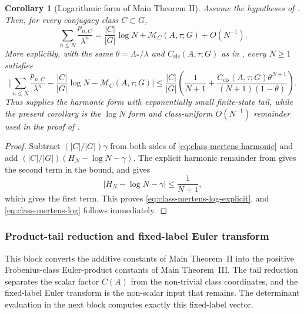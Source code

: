 \documentclass[11pt,a4paper]{amsart}
\theoremstyle{plain}
\newtheorem{corollary}[theorem]{Corollary}
\theoremstyle{definition}
\theoremstyle{remark}
\newcommand{\abs}[1]{\lvert #1 \rvert}
\begin{document}
\begin{corollary}[Logarithmic form of Main Theorem II]
  \label{cor:class-mertens-log-form}
  Assume the hypotheses of .  Then, for
  every conjugacy class \(C\subset G\),
  \begin{equation}\label{eq:class-mertens-log}
    \sum_{n\le N}\frac{p_{n,C}}{\lambda^n}
    =
    \frac{|C|}{|G|}\log N+\mathcal M_C(A,\tau;G)+O(N^{-1}).
  \end{equation}
  More explicitly, with the same \(\theta=\Lambda_*/\lambda\) and
  \(C_{\mathrm{cls}}(A,\tau;G)\) as in
  , every \(N\ge1\) satisfies
  \begin{equation}\label{eq:class-mertens-log-explicit}
    \abs{
      \sum_{n\le N}\frac{p_{n,C}}{\lambda^n}
      -\frac{|C|}{|G|}\log N
      -\mathcal M_C(A,\tau;G)
    }
    \le
    \frac{|C|}{|G|}
    \left(
      \frac{1}{N+1}
      +
      \frac{
        C_{\mathrm{cls}}(A,\tau;G)\theta^{N+1}
      }{
        (N+1)(1-\theta)
      }
    \right).
  \end{equation}
  Thus  supplies the harmonic form with
  exponentially small finite-state tail, while the present corollary is the
  \(\log N\) form and class-uniform \(O(N^{-1})\) remainder used in the
  proof of .
\end{corollary}

\begin{proof}
  Subtract \((|C|/|G|)\gamma\) from both sides of
  \eqref{eq:class-mertens-harmonic} and add
  \((|C|/|G|)(H_N-\log N-\gamma)\).  The explicit harmonic remainder from
   gives the second term in the bound, and
   gives
  \[
    \abs{H_N-\log N-\gamma}
    \le
    \frac{1}{N+1},
  \]
  which gives the first term.  This proves
  \eqref{eq:class-mertens-log-explicit}, and
  \eqref{eq:class-mertens-log} follows immediately.
\end{proof}


\subsubsection{Product-tail reduction and fixed-label Euler transform}
\label{subsubsec:class-product-tail-reduction}

This block converts the additive constants of Main Theorem~II into the
positive Frobenius-class Euler-product constants of Main Theorem~III.  The
tail reduction separates the scalar factor \(C(A)\) from the non-trivial class
coordinates, and the fixed-label Euler transform is the non-scalar input that
remains.  The determinant evaluation in the next block computes exactly this
fixed-label vector.
\end{document}
